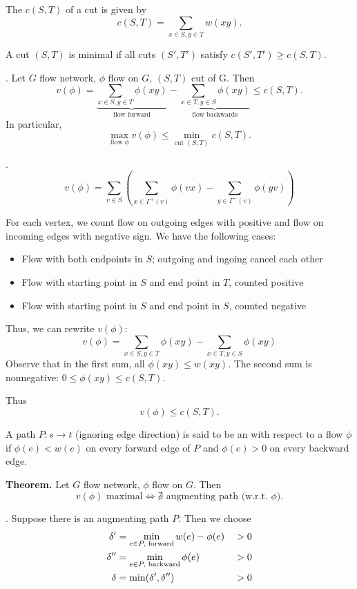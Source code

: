 \begin{definition}
The  $c(S,T)$ of a cut is given by
\[ c(S,T) = \sum_{x\in S, y\in T} w(xy). \]
\end{definition}

A cut $(S,T)$ is minimal if all cuts $(S',T')$ satisfy $c(S', T') \geq c(S,T)$.

\Lemma. Let $G$ flow network, $\phi$ flow on $G$, $(S,T)$ cut of G. Then
\[
v(\phi) = \underbrace{\sum_{x\in S, y\in T} \phi(xy)}_{\text{flow forward}}
        - \underbrace{\sum_{x\in T, y\in S} \phi(xy)}_{\text{flow backwards}}
\leq c(S,T).
\]
In particular,
\[
  \max_{\text{flow $\phi$}} v(\phi)\leq \min_{\text{cut $(S,T)$}} c(S,T).
\]

\Proof.
\[
    v(\phi) = \sum_{v\in S} \left(
        \sum_{x\in \Gamma^+(v)} \phi(vx)
      - \sum_{y\in \Gamma^-(v)} \phi(yv)
    \right)
\]

For each vertex, we count flow on outgoing edges with positive and flow on
incoming edges with negative sign. We have the following cases:
\begin{itemize}
\item Flow with both endpoints in $S$; outgoing and ingoing cancel each other
\item Flow with starting point in $S$ and end point in $T$, counted positive
\item Flow with starting point in $S$ and end point in $S$, counted negative
\end{itemize}

Thus, we can rewrite $v(\phi)$:
\[
    v(\phi) = \sum_{x\in S, y\in T} \phi(xy)
            - \sum_{x\in T, y\in S} \phi(xy)
\]
Observe that in the first sum, all $\phi (xy) \leq w(xy)$. The second sum is
nonnegative: $0 \leq \phi (xy) \leq c(S,T)$.

Thus
\[
    v(\phi) \leq c(S,T).
\]

\begin{definition}
A path $P: s\rightarrow t$ (ignoring edge direction) is said to be an  with respect to a flow $\phi$ if $\phi(e) < w(e)$ on every forward edge
of $P$ and $\phi(e) > 0$ on every backward edge.
\end{definition}

\textbf{Theorem.}
Let $G$ flow network, $\phi$ flow on $G$. Then 
\[v(\phi)\text{ maximal} \iff \nexists\text{ augmenting path (w.r.t. $\phi$)}.\]

\ProofForward.
Suppose there is an augmenting path $P$. Then we choose
\begin{alignat*}{3}
    \delta' &= \min_{e \in P,\text{ forward}} w(e) - \phi(e) &\null> 0 \\
    \delta'' &= \min_{e\in P,\text{ backward}} \phi(e) &\null> 0 \\
    \delta &= \min(\delta', \delta'') &> 0
\end{alignat*}


